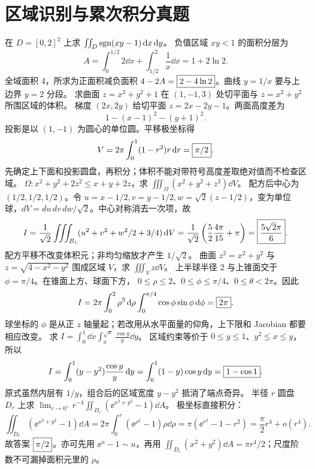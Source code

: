 \section{区域识别与累次积分真题}
在 $D=[0,2]^2$ 上求 $\iint_D\operatorname{sgn}(xy-1)\,\mathrm d x\,\mathrm d y$。
\sol 负值区域 $xy<1$ 的面积分层为
\[A=\int_0^{1/2}2\dd x+\int_{1/2}^2\frac1x\dd x=1+2\ln2.\]
全域面积 4，所求为正面积减负面积 $4-2A=\boxed{2-4\ln2}$。曲线 $y=1/x$ 要与上边界 $y=2$ 分段。
求曲面 $z=x^2+y^2+1$ 在 $(1,-1,3)$ 处切平面与 $z=x^2+y^2$ 所围区域的体积。
\sol 梯度 $(2x,2y)$ 给切平面 $z=2x-2y-1$。两面高度差为
\[1-(x-1)^2-(y+1)^2.\]
投影是以 $(1,-1)$ 为圆心的单位圆。平移极坐标得
\[V=2\pi\int_0^1(1-r^2)r\,\mathrm d r=\boxed{\pi/2}.\]
先确定上下面和投影圆盘，再积分；体积不能对带符号高度差取绝对值而不检查区域。
$\Omega:x^2+y^2+2z^2\le x+y+2z$，求 $\iiint_\Omega(x^2+y^2+z^2)\dd V$。
\sol 配方后中心为 $(1/2,1/2,1/2)$。令 $u=x-1/2,v=y-1/2,w=\sqrt2(z-1/2)$，变为单位球，$dV=du\,dv\,dw/\sqrt2$。中心对称消去一次项，故
\[
I=\frac1{\sqrt2}\iiint_{B_1}(u^2+v^2+w^2/2+3/4)\,\mathrm d V
=\frac1{\sqrt2}\left(\frac52\frac{4\pi}{15}+\pi\right)
=\boxed{\frac{5\sqrt2\pi}{6}}.
\]
配方平移不改变体积元；非均匀缩放才产生 $1/\sqrt2$。
曲面 $z^2=x^2+y^2$ 与 $z=\sqrt{4-x^2-y^2}$ 围成区域 $V$，求 $\iiint_V z\dd V$。
\sol 上半球半径 2 与上锥面交于 $\phi=\pi/4$。在锥面上方、球面下方，
$0\le\rho\le2$、$0\le\phi\le\pi/4$、$0\le\theta<2\pi$。因此
\[
I=2\pi\int_0^2\rho^3\,\mathrm d\rho\int_0^{\pi/4}\cos\phi\sin\phi\,\mathrm d\phi
=\boxed{2\pi}.
\]
球坐标的 $\phi$ 是从正 $z$ 轴量起；若改用从水平面量的仰角，上下限和 Jacobian 都要相应改变。
求 $\displaystyle I=\int_0^1\dd x\int_x^{\sqrt x}\frac{\cos y}{y}\dd y$。
\sol 区域约束等价于 $0\le y\le1$、$y^2\le x\le y$，所以
\[
I=\int_0^1(y-y^2)\frac{\cos y}y\,\mathrm d y
=\int_0^1(1-y)\cos y\,\mathrm d y
=\boxed{1-\cos1}.
\]
原式虽然内层有 $1/y$，组合后的区域宽度 $y-y^2$ 抵消了端点奇异。
半径 $r$ 圆盘 $D_r$ 上求 $\lim_{r\to0^+}r^{-4}\iint_{D_r}(\ee^{x^2+y^2}-1)\dd A$。
\sol 极坐标直接积分：
\[
\iint_{D_r}(\ee^{x^2+y^2}-1)\dd A
=2\pi\int_0^r(\ee^{\rho^2}-1)\rho\dd\rho
=\pi(\ee^{r^2}-1-r^2)
=\frac\pi2r^4+o(r^4).
\]
故答案 $\boxed{\pi/2}$。亦可先用 $\ee^u-1\sim u$，再用 $\iint_{D_r}(x^2+y^2)\dd A=\pi r^4/2$；尺度阶数不可漏掉面积元里的 $\rho$。
